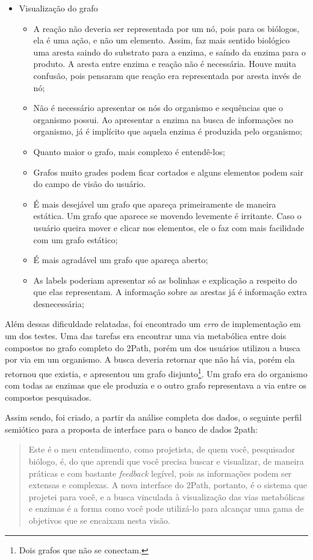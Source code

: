\begin{itemize}
\item Visualização do grafo
  \begin{itemize}
  \item[1] A reação não deveria ser representada por um nó, pois para os biólogos, ela é uma ação, e não um elemento. Assim, faz mais sentido biológico uma aresta saindo do substrato para a enzima, e saíndo da enzima para o produto. A aresta entre enzima e reação não é necessária. Houve muita confusão, pois pensaram que reação era representada por aresta invés de nó;
  \item[2] Não é necessário apresentar os nós do organismo e sequências que o organismo possui. Ao apresentar a enzima na busca de informações no organismo, já é implícito que aquela enzima é produzida pelo organismo;
  \item[3] Quanto maior o grafo, mais complexo é entendê-los;
  \item[4] Grafos muito grades podem ficar cortados e alguns elementos podem sair do campo de visão do usuário.
  \item[5] É mais desejável um grafo que apareça primeiramente de maneira estática. Um grafo que aparece se movendo levemente é irritante. Caso o usuário queira mover e clicar nos elementos, ele o faz com mais facilidade com um grafo estático;
  \item[6] É mais agradável um grafo que apareça aberto;
  \item[7] As labels poderiam apresentar só as bolinhas e explicação a respeito do que elas representam. A informação sobre as arestas já é informação extra desnecessária;
  \end{itemize}
\end{itemize}


\indent Além dessas dificuldade relatadas, foi encontrado um \textit{erro} de implementação em um dos testes. Uma das tarefas era encontrar uma via metabólica entre dois compostos no grafo completo do 2Path, porém um dos usuários utilizou a busca por via em um organismo. A busca deveria retornar que não há via, porém ela retornou que existia, e apresentou um grafo disjunto\footnote{Dois grafos que não se conectam.}. Um grafo era do organismo com todas as enzimas que ele produzia e o outro grafo representava a via entre os compostos pesquisados.

\indent Assim sendo, foi criado, a partir da análise completa dos dados, o seguinte perfil semiótico para a proposta de interface para o banco de dados 2path:

\begin{quote}
	Este é o meu entendimento, como projetista, de quem você, pesquisador biólogo, é, do que aprendi que você precisa buscar e visualizar, de maneira práticas e com bastante \textit{feedback} legível, pois as informações podem ser extensas e complexas. A nova interface do 2Path, portanto, é o sistema que projetei para você, e a busca vinculada à visualização das vias metabólicas e enzimas é a forma como você pode utilizá-lo para alcançar uma gama de objetivos que se encaixam nesta visão.
\end{quote}

